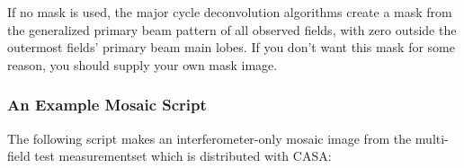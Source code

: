 If no mask is used, the major cycle deconvolution algorithms create a
mask from the generalized primary beam pattern of all observed fields,
with zero outside the outermost fields' primary beam main lobes.  If
you don't want this mask for some reason, you should supply your own
mask image.

\subsubsection{An Example Mosaic Script}
\label{subsubsection:synth.mosaic.example}

The following script makes an interferometer-only mosaic image from
the multi-field test measurementset which is distributed with CASA:

\small

